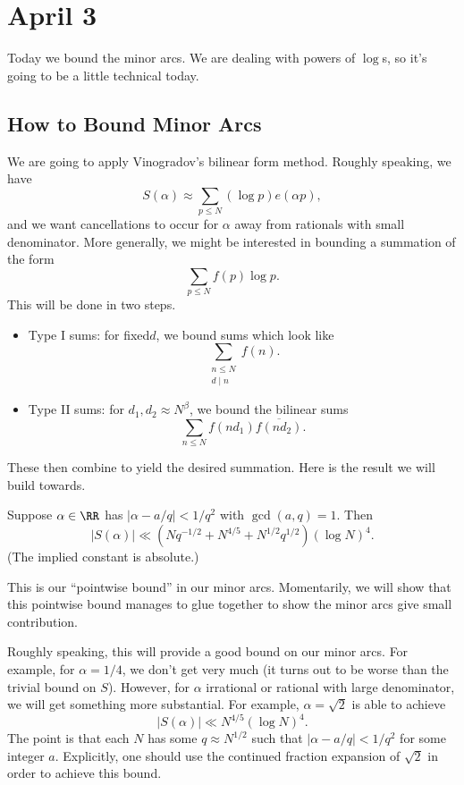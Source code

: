 \documentclass[../notes.tex]{subfiles}
\begin{document}
\section{April 3}

Today we bound the minor arcs. We are dealing with powers of $\log$s, so it's going to be a little technical today.

\subsection{How to Bound Minor Arcs}
We are going to apply Vinogradov's bilinear form  method. Roughly speaking, we have
\[S(\alpha)\approx\sum_{p\le N}(\log p)e(\alpha p),\]
and we want cancellations to occur for $\alpha$ away from rationals with small denominator. More generally, we might be interested in bounding a summation of the form
\[\sum_{p\le N}f(p)\log p.\]
This will be done in two steps.
\begin{itemize}
	\item Type I sums: for fixed$d$, we bound sums which look like
	\[\sum_{\substack{n\le N\\d\mid n}}f(n).\]
	\item Type II sums: for $d_1,d_2\approx N^\beta$, we bound the bilinear sums
	\[\sum_{n\le N}f(nd_1)\overline{f(nd_2)}.\]
\end{itemize}
These then combine to yield the desired summation. Here is the result we will build towards.
\begin{theorem}[Vinogradov] \label{thm:vinogradov-minor}
	Suppose $\alpha\in\RR$ has $|\alpha-a/q|<1/q^2$ with $\gcd(a,q)=1$. Then
	\[|S(\alpha)|\ll\left(Nq^{-1/2}+N^{4/5}+N^{1/2}q^{1/2}\right)(\log N)^4.\]
	(The implied constant is absolute.)
\end{theorem}
\begin{remark}
	This is our ``pointwise bound'' in our minor arcs. Momentarily, we will show that this pointwise bound manages to glue together to show the minor arcs give small contribution.
\end{remark}
Roughly speaking, this will provide a good bound on our minor arcs. For example, for $\alpha=1/4$, we don't get very much (it turns out to be worse than the trivial bound on $S$). However, for $\alpha$ irrational or rational with large denominator, we will get something more substantial. For example, $\alpha=\sqrt2$ is able to achieve
\[|S(\alpha)|\ll N^{4/5}(\log N)^4.\]
The point is that each $N$ has some $q\approx N^{1/2}$ such that $|\alpha-a/q|<1/q^2$ for some integer $a$. Explicitly, one should use the continued fraction expansion of $\sqrt2$ in order to achieve this bound.
\end{document}
